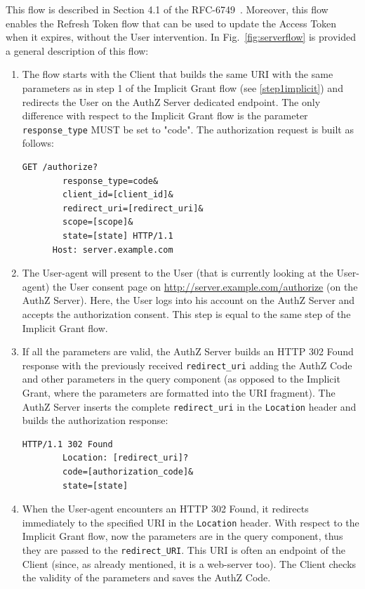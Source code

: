 \documentclass[a4paper,12pt]{article}
\def\myfig#1{Fig.~#1\xspace}
\def\rfc#1{RFC-#1\xspace}
\begin{document}
This flow is described in Section 4.1 of the \rfc{6749}\ \cite{RFC6749}. Moreover, this flow enables the Refresh Token flow that can be used to update the Access Token when it expires, without the User intervention. In \myfig{\ref{fig:serverflow}} is provided a general description of this flow:



\begin{enumerate}
    \item The flow starts with the Client that builds the same URI with the same parameters as in step 1 of the Implicit Grant flow (see \ref{step1implicit}) and redirects the User on the AuthZ Server dedicated endpoint. The only difference with respect to the Implicit Grant flow is the parameter \texttt{response\_type} MUST be set to "code". The authorization request is built as follows:
    
    \begin{lstlisting}[basicstyle=\ttfamily]
      GET /authorize?
        response_type=code&
        client_id=[client_id]&
        redirect_uri=[redirect_uri]&
        scope=[scope]&
        state=[state] HTTP/1.1
      Host: server.example.com
    \end{lstlisting}
    
    \item The User-agent will present to the User (that is currently looking at the User-agent) the User consent page on \url{http://server.example.com/authorize} (on the AuthZ Server). Here, the User logs into his account on the AuthZ Server and accepts the authorization consent. This step is equal to the same step of the Implicit Grant flow.
    
    \item If all the parameters are valid, the AuthZ Server builds an HTTP 302 Found response with the previously received \texttt{redirect\_uri} adding the AuthZ Code and other parameters in the query component (as opposed to the Implicit Grant, where the parameters are formatted into the URI fragment).  The AuthZ Server inserts the complete \texttt{redirect\_uri} in the \texttt{Location} header and builds the authorization response:
    
    \begin{lstlisting}[basicstyle=\ttfamily]
      HTTP/1.1 302 Found
        Location: [redirect_uri]?
        code=[authorization_code]&
        state=[state]
    \end{lstlisting}
    
    \item When the User-agent encounters an HTTP 302 Found,  it redirects immediately to the specified URI in the \texttt{Location} header. With respect to the Implicit Grant flow, now the parameters are in the query component, thus they are passed to the \texttt{redirect\_URI}. This URI is often an endpoint of the Client (since, as already mentioned, it is a web-server too). The Client checks the validity of the parameters and saves the AuthZ Code.
    

\end{enumerate}
\end{document}
